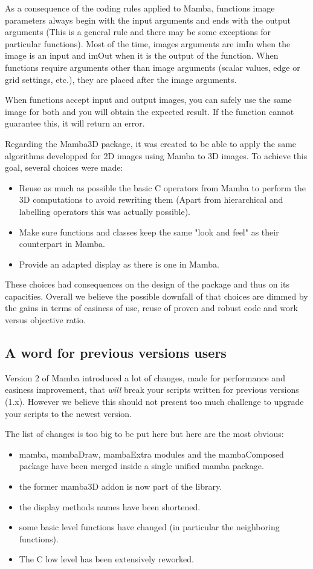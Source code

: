 \documentclass[a4paper,10pt,oneside]{article}
\begin{document}
As a consequence of the coding rules applied to Mamba, functions image parameters
always begin with the input arguments and ends with the output arguments (This 
is a general rule and there may be some exceptions for particular functions).
Most of the time, images arguments are imIn when the image is an input and imOut
when it is the output of the function. When functions require arguments other than 
image arguments (scalar values, edge or grid settings, etc.), they are placed after 
the image arguments.

When functions accept input and output images, you can safely use the same image
for both and you will obtain the expected result. If the function cannot 
guarantee this, it will return an error.

Regarding the Mamba3D package, it was created to be able to apply the same
algorithms developped for 2D images using Mamba to 3D images. To achieve
this goal, several choices
were made:

\begin{itemize}
\item Reuse as much as possible the basic C operators from Mamba to perform
the 3D computations to avoid rewriting them (Apart from hierarchical and
labelling operators this was actually possible).
\item Make sure functions and classes keep the same "look and feel" as their
counterpart in Mamba.
\item Provide an adapted display as there is one in Mamba.
\end{itemize}

These choices had consequences on the design of the package and thus on its
capacities. Overall we believe the possible downfall of that choices are
dimmed by the gains in terms of easiness of use, reuse of proven and robust
code and work versus objective ratio.

\subsection{A word for previous versions users}

Version 2 of Mamba introduced a lot of changes, made for performance and
easiness improvement, that \emph{will} break your scripts written for previous
versions (1.x). However we believe this should not present too much challenge
to upgrade your scripts to the newest version.

The list of changes is too big to be put here but here are the most obvious:
\begin{itemize}
\item mamba, mambaDraw, mambaExtra modules and the mambaComposed package have
been merged inside a single unified mamba package.
\item the former mamba3D addon is now part of the library.
\item the display methods names have been shortened.
\item some basic level functions have changed (in particular the neighboring
functions).
\item The C low level has been extensively reworked.
\end{itemize}
\end{document}
